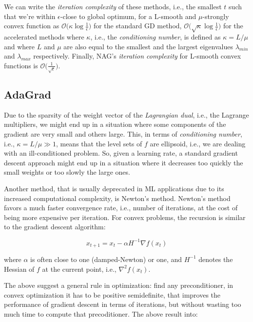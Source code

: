 \bigskip

We can write the \emph{iteration complexity} of these methods, i.e., the smallest $t$ such that we’re within $\epsilon$-close to global optimum, for a L-smooth and $\mu$-strongly convex function as $\displaystyle \mathcal{O}\Big(\kappa \log \frac{1}{\epsilon}\Big)$ for the standard GD method, $\displaystyle \mathcal{O}\Big(\sqrt{\kappa}\log \frac{1}{\epsilon}\Big)$ for the accelerated methods where $\kappa$, i.e., the \emph{conditioning number}, is defined as $\kappa = L/\mu$ and where $L$ and $\mu$ are also equal to the smallest and the largest eigenvalues $\lambda_{min}$ and $\lambda_{max}$ respectively. Finally, NAG's \emph{iteration complexity} for L-smooth convex functions is $\displaystyle \mathcal{O}\Big(\frac{1}{\sqrt{\epsilon}}\Big)$.

\pagebreak

\subsection{AdaGrad}

Due to the sparsity of the weight vector of the \emph{Lagrangian dual}, i.e., the Lagrange multipliers, we might end up in a situation where some components of the gradient are very small and others large. This, in terms of \emph{conditioning number}, i.e., $\kappa = L/\mu \gg 1$, means that the level sets of $f$ are ellipsoid, i.e., we are dealing with an ill-conditioned problem. So, given a learning rate, a standard gradient descent approach might end up in a situation where it decreases too quickly the small weights or too slowly the large ones.

Another method, that is usually deprecated in ML applications due to its increased computational complexity, is Newton’s method. Newton’s method favors a much faster convergence rate, i.e., number of iterations, at the cost of being more expensive per iteration. For convex problems, the recursion is similar to the gradient descent algorithm:

$$
x_{t+1} = x_t - \alpha H^{-1} \nabla f(x_t)
$$

where $\alpha$ is often close to one (damped-Newton) or one, and $H^{-1}$ denotes the Hessian of $f$ at the current point, i.e., $\nabla^2 f(x_t)$.

The above suggest a general rule in optimization: find any preconditioner, in convex optimization it has to be positive semidefinite, that improves the performance of gradient descent in terms of iterations, but without wasting too much time to compute that precoditioner. The above result into:

